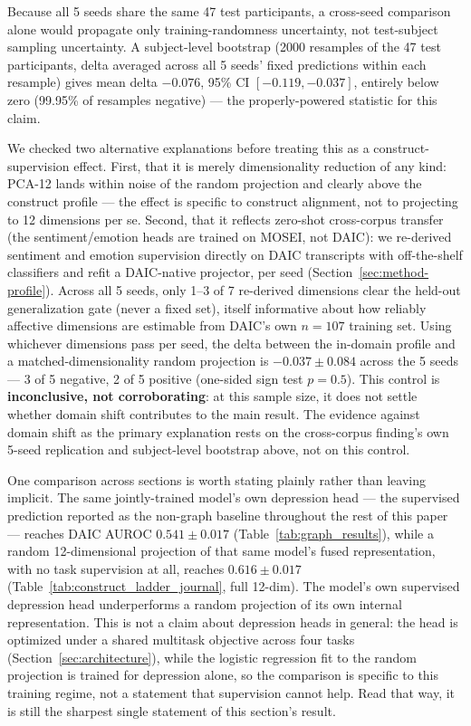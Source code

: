 \documentclass[twocolumn]{article}
\begin{document}
Because all 5 seeds share the same 47 test participants, a cross-seed comparison alone would propagate only training-randomness uncertainty, not test-subject sampling uncertainty. A subject-level bootstrap (2000 resamples of the 47 test participants, delta averaged across all 5 seeds' fixed predictions within each resample) gives mean delta $-0.076$, 95\% CI $[-0.119, -0.037]$, entirely below zero (99.95\% of resamples negative) — the properly-powered statistic for this claim.

We checked two alternative explanations before treating this as a construct-supervision effect. First, that it is merely dimensionality reduction of any kind: PCA-12 lands within noise of the random projection and clearly above the construct profile — the effect is specific to construct alignment, not to projecting to 12 dimensions per se. Second, that it reflects zero-shot cross-corpus transfer (the sentiment/emotion heads are trained on MOSEI, not DAIC): we re-derived sentiment and emotion supervision directly on DAIC transcripts with off-the-shelf classifiers \citep{cardiffnlp2021twitter,hartmann2022emotion} and refit a DAIC-native projector, per seed (Section~\ref{sec:method-profile}). Across all 5 seeds, only 1--3 of 7 re-derived dimensions clear the held-out generalization gate (never a fixed set), itself informative about how reliably affective dimensions are estimable from DAIC's own $n{=}107$ training set. Using whichever dimensions pass per seed, the delta between the in-domain profile and a matched-dimensionality random projection is $-0.037 \pm 0.084$ across the 5 seeds — 3 of 5 negative, 2 of 5 positive (one-sided sign test $p{=}0.5$). This control is \textbf{inconclusive, not corroborating}: at this sample size, it does not settle whether domain shift contributes to the main result. The evidence against domain shift as the primary explanation rests on the cross-corpus finding's own 5-seed replication and subject-level bootstrap above, not on this control.

One comparison across sections is worth stating plainly rather than leaving implicit. The same jointly-trained model's own depression head — the supervised prediction reported as the non-graph baseline throughout the rest of this paper — reaches DAIC AUROC $0.541\pm0.017$ (Table~\ref{tab:graph_results}), while a random 12-dimensional projection of that same model's fused representation, with no task supervision at all, reaches $0.616\pm0.017$ (Table~\ref{tab:construct_ladder_journal}, full 12-dim). The model's own supervised depression head underperforms a random projection of its own internal representation. This is not a claim about depression heads in general: the head is optimized under a shared multitask objective across four tasks (Section~\ref{sec:architecture}), while the logistic regression fit to the random projection is trained for depression alone, so the comparison is specific to this training regime, not a statement that supervision cannot help. Read that way, it is still the sharpest single statement of this section's result.
\end{document}
